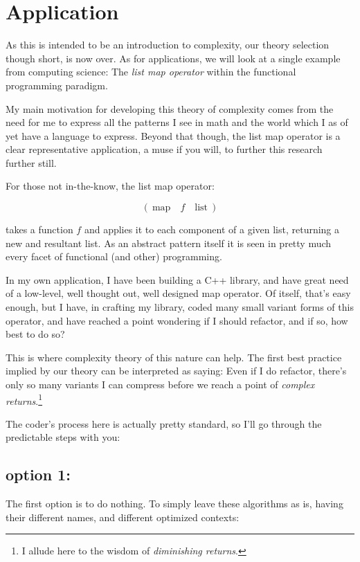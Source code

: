 \documentclass[twoside]{article}
\begin{document}
\section*{Application}

As this is intended to be an introduction to complexity, our theory selection though short, is now over. As for
applications, we will look at a single example from computing science: The \emph{list map operator} within the
functional programming paradigm.

My main motivation for developing this theory of complexity comes from the need for me to express all the patterns I
see in math and the world which I as of yet have a language to express. Beyond that though, the list map operator
is a clear representative application, a muse if you will, to further this research further still.

For those not in-the-know, the list map operator:

$$ (\ \mbox{map}\quad f\quad \mbox{list}\ ) $$

takes a function $ f $ and applies it to each component of a given list, returning a new and resultant list.
As an abstract pattern itself it is seen in pretty much every facet of functional (and other) programming.

In my own application, I have been building a C++ library, and have great need of a low-level, well thought out,
well designed map operator. Of itself, that's easy enough, but I have, in crafting my library, coded many small
variant forms of this operator, and have reached a point wondering if I should refactor, and if so, how best to do so?

This is where complexity theory of this nature can help. The first best practice implied by our theory can be interpreted
as saying: Even if I do refactor, there's only so many variants I can compress before we reach a point
of \emph{complex returns}.\footnote{I allude here to the wisdom of \emph{diminishing returns}.}

The coder's process here is actually pretty standard, so I'll go through the predictable steps with you:

\subsection*{option 1:}

The first option is to do nothing. To simply leave these algorithms as is, having their different names, and different optimized
contexts:
\end{document}
